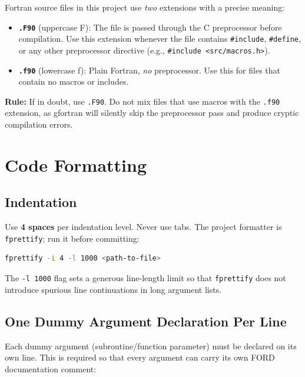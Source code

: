 \documentclass{article}
\begin{document}
Fortran source files in this project use \emph{two} extensions with a precise meaning:

\begin{itemize}
  \item \textbf{\texttt{.F90}} (uppercase F): The file is passed through the C preprocessor before compilation.
    Use this extension whenever the file contains \texttt{\#include}, \texttt{\#define}, or any other preprocessor directive (e.g., \texttt{\#include <src/macros.h>}).
  \item \textbf{\texttt{.f90}} (lowercase f): Plain Fortran, \emph{no} preprocessor. Use this for files that contain no macros or includes.
\end{itemize}

\textbf{Rule:} If in doubt, use \texttt{.F90}. Do not mix files that use macros with the \texttt{.f90} extension, as gfortran will silently skip the preprocessor pass and produce cryptic compilation errors.

\section{Code Formatting}

\subsection{Indentation}

Use \textbf{4 spaces} per indentation level. Never use tabs. The project formatter is \texttt{fprettify}; run it before committing:

\begin{lstlisting}[language=bash]
fprettify -i 4 -l 1000 <path-to-file>
\end{lstlisting}

The \texttt{-l 1000} flag sets a generous line-length limit so that \texttt{fprettify} does not introduce spurious line continuations in long argument lists.

\subsection{One Dummy Argument Declaration Per Line}\label{sec:one-arg-per-line}

Each dummy argument (subroutine/function parameter) must be declared on its own line. This is required so that every argument can carry its own FORD documentation comment:
\end{document}
